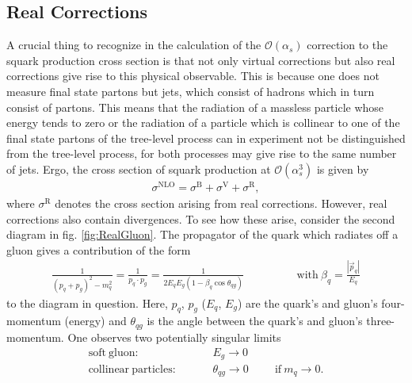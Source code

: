 \subsection{Real Corrections}
A crucial thing to recognize in the calculation of the $\mathcal{O}(\alpha_s)$ correction to the squark production cross section is that not only virtual corrections but also real corrections give rise to this physical observable. This is because one does not measure final state partons but jets, which consist of hadrons which in turn consist of partons. This means that the radiation of a massless particle whose energy tends to zero or the radiation of a particle which is collinear to one of the final state partons of the tree-level process can in experiment not be distinguished from the tree-level process, for both processes may give rise to the same number of jets. Ergo, the cross section of squark production at $\mathcal{O}(\alpha_s^3)$ is given by
\begin{align}
\sigma^{\mathrm{NLO}} = \sigma^{\mathrm{B}} + \sigma^{\mathrm{V}} + \sigma^{\mathrm{R}},
\end{align}
where $\sigma^{\mathrm{R}}$ denotes the cross section arising from real corrections. However, real corrections also contain divergences. To see how these arise, consider the second diagram in fig. \ref{fig:RealGluon}. The propagator of the quark which radiates off a gluon gives a contribution of the form
\begin{align}
\frac{1}{(p_q + p_g)^2 - m_q^2} = \frac{1}{p_q \cdot p_g} = \frac{1}{2E_qE_g(1-\beta_q \cos \theta_{qg})} \hspace{2cm} \mathrm{with}\ \beta_q = \frac{|\vec{p}_q|}{E_q}
\end{align}
to the diagram in question. Here, $p_q$, $p_g$ ($E_q$, $E_g$) are the quark's and gluon's four-momentum (energy) and $\theta_{qg}$ is the angle between the quark's and gluon's three-momentum. One observes two potentially singular limits
\begin{align}
\mathrm{soft\ gluon:}& \hspace{1cm} E_g \to 0\\
\mathrm{collinear\ particles:}& \hspace{1cm} \theta_{qg} \to 0 \hspace{1cm} \mathrm{if}\ m_q \to 0.\label{eq:collLimit}
\end{align}
